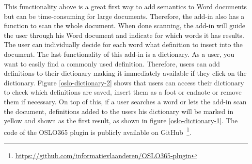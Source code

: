 \documentclass[manuscript]{acmart}
\begin{document}
This functionality above is a great first way to add semantics to Word documents but can be time-consuming for large documents. 
Therefore, the add-in also has a function to scan the whole document. 
When done scanning, the add-in will guide the user through his Word document and indicate for which words it has results. 
The user can individually decide for each word what definition to insert into the document. 
The last functionality of this add-in is a dictionary. 
As a user, you want to easily find a commonly used definition. 
Therefore, users can add definitions to their dictionary making it immediately available if they click on the dictionary. Figure \ref{oslo-dictionary-2} shows that users can access their dictionary to check which definitions are saved, insert them as a foot or endnote or remove them if necessary.
On top of this, if a user searches a word or lets the add-in scan the document, definitions added to the users his dictionary will be marked in yellow and shown as the first result, as shown in figure \ref{oslo-dictionary-1}. The code of the OSLO365 plugin is publicly available on GitHub~\footnote{\url{https://github.com/informatievlaanderen/OSLO365-plugin}}.
\end{document}
